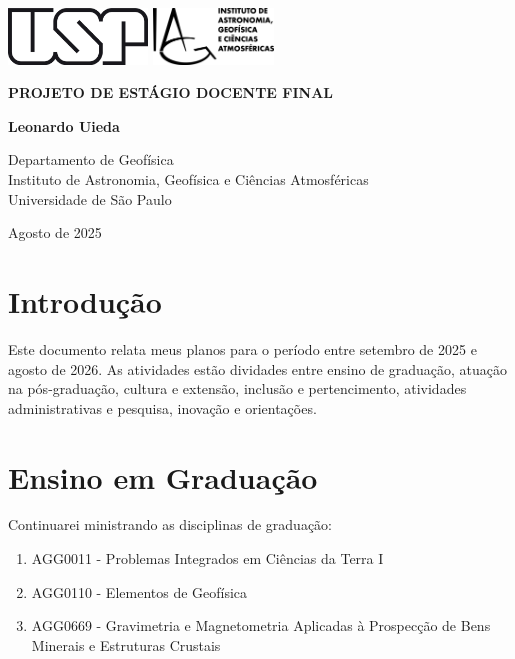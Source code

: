 \documentclass[12pt,a4paper,oneside]{book}
\newcommand{\Title}{Projeto de Estágio Docente Final}
\newcommand{\Year}{2025}
\newcommand{\Date}{Agosto de \Year{}}
\newcommand{\Author}{Leonardo Uieda}
\begin{document}
\pagestyle{empty}
\frontmatter

\begin{titlepage}
  \begin{center}
    \includegraphics[height=1.5cm]{figures/usp.png}
    \hfill
    \includegraphics[height=1.5cm]{figures/iag.png}
    \vspace{9cm}

    \textbf{\Huge \MakeUppercase{\Title{}}}
    \vspace{2cm}

    \textbf{\LARGE \Author{}}
    \vfill

    Departamento de Geofísica
    \\
    Instituto de Astronomia, Geofísica e Ciências Atmosféricas
    \\
    Universidade de São Paulo
    \vspace{2cm}

    \Date{}
  \end{center}
\end{titlepage}

\tableofcontents

\mainmatter
\pagestyle{fancy}

\chapter{Introdução}

Este documento relata meus planos para o período entre setembro de 2025
e agosto de 2026. As atividades estão dividades entre ensino de graduação,
atuação na pós-graduação, cultura e extensão, inclusão e pertencimento,
atividades administrativas e pesquisa, inovação e orientações.

\chapter{Ensino em Graduação}

Continuarei ministrando as disciplinas de graduação:

\begin{enumerate}
    \item AGG0011 - Problemas Integrados em Ciências da Terra I
    \item AGG0110 - Elementos de Geofísica
    \item AGG0669 - Gravimetria e Magnetometria Aplicadas à Prospecção de Bens Minerais e Estruturas Crustais
\end{enumerate}
\end{document}
